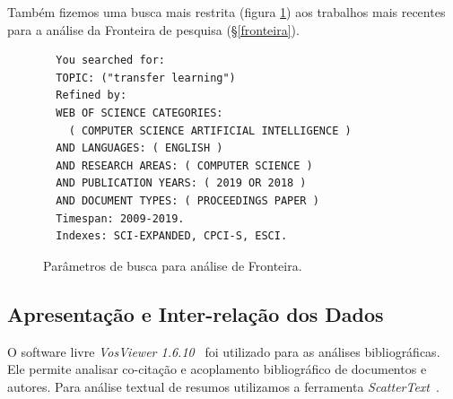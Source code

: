 \documentclass[sigconf]{acmart}
\begin{document}
Também fizemos uma busca mais restrita (figura \ref{card:sota}) aos trabalhos mais recentes para a análise da Fronteira de pesquisa (\S \ref{fronteira}).
\begin{figure}[htp]
  \begin{tcolorbox}[colback=yellow!5!white,colframe=gray!75!black,title={Results: 161 (from Web of Science Core Collection)}]
  \begin{verbatim}
  You searched for: 
  TOPIC: ("transfer learning")
  Refined by: 
  WEB OF SCIENCE CATEGORIES: 
    ( COMPUTER SCIENCE ARTIFICIAL INTELLIGENCE )
  AND LANGUAGES: ( ENGLISH ) 
  AND RESEARCH AREAS: ( COMPUTER SCIENCE )
  AND PUBLICATION YEARS: ( 2019 OR 2018 )
  AND DOCUMENT TYPES: ( PROCEEDINGS PAPER )
  Timespan: 2009-2019. 
  Indexes: SCI-EXPANDED, CPCI-S, ESCI.
  \end{verbatim}

  
  \end{tcolorbox}
  \caption{Parâmetros de busca para análise de Fronteira.}
  \label{card:sota}
\end{figure}

\subsection{Apresentação e Inter-relação dos Dados}
O software livre \emph{VosViewer 1.6.10}~\cite{VOSviewer} foi utilizado para as análises bibliográficas. Ele permite analisar co-citação e acoplamento bibliográfico de documentos e autores. Para análise textual de resumos utilizamos a ferramenta \emph{ScatterText}~\cite{kessler2017scattertext}.
\end{document}

